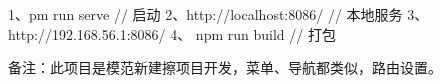 
1、pm run serve  // 启动
2、http://localhost:8086/  // 本地服务
3、http://192.168.56.1:8086/
4、 npm run build  // 打包

备注：此项目是模范新建擦项目开发，菜单、导航都类似，路由设置。